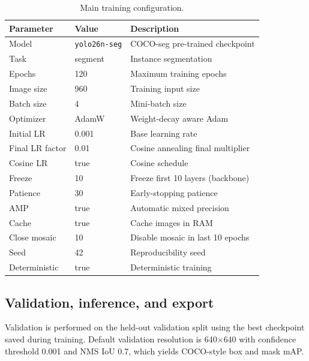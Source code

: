\documentclass[11pt,a4paper]{article}
\newcommand{\tool}[1]{\texttt{#1}}
\newcommand{\modelname}{\tool{yolo26n-seg}}
\begin{document}
\begin{table}[htbp]
\centering
\caption{Main training configuration.}\label{tab:train_cfg}
\begin{tabular}{lll}
\toprule
\textbf{Parameter} & \textbf{Value} & \textbf{Description} \\
\midrule
Model              & \modelname{}   & COCO-seg pre-trained checkpoint \\
Task               & segment        & Instance segmentation \\
Epochs             & 120            & Maximum training epochs \\
Image size         & 960            & Training input size \\
Batch size         & 4              & Mini-batch size \\
Optimizer          & AdamW          & Weight-decay aware Adam \\
Initial LR         & 0.001          & Base learning rate \\
Final LR factor    & 0.01           & Cosine annealing final multiplier \\
Cosine LR          & true           & Cosine schedule \\
Freeze             & 10             & Freeze first 10 layers (backbone) \\
Patience           & 30             & Early-stopping patience \\
AMP                & true           & Automatic mixed precision \\
Cache              & true           & Cache images in RAM \\
Close mosaic       & 10             & Disable mosaic in last 10 epochs \\
Seed               & 42             & Reproducibility seed \\
Deterministic      & true           & Deterministic training \\
\bottomrule
\end{tabular}
\end{table}

\subsection{Validation, inference, and export}

Validation is performed on the held-out validation split using the best checkpoint saved during training. Default validation resolution is 640$\times$640 with confidence threshold 0.001 and NMS IoU 0.7, which yields COCO-style box and mask mAP.
\end{document}
